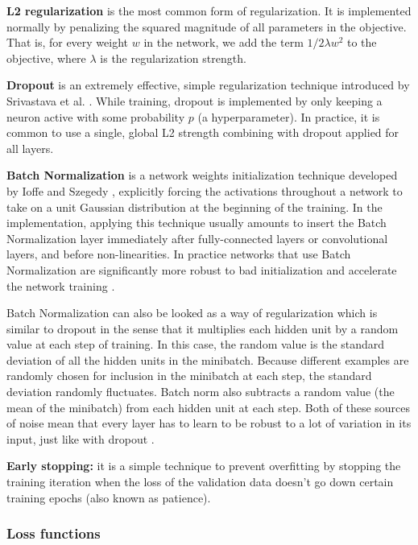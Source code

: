 \noindent\textbf{L2 regularization} is the most common form of regularization. It is implemented normally by penalizing the squared magnitude of all parameters in the objective. That is, for every weight $w$ in the network, we add the term $1/2 \lambda w^2$ to the objective, where $\lambda$ is the regularization strength.

\noindent\textbf{Dropout} is an extremely effective, simple regularization technique introduced by Srivastava et al. \cite{Srivastava2014}. While training, dropout is implemented by only keeping a neuron active with some probability $p$ (a hyperparameter). In practice, it is common to use a single, global L2 strength combining with dropout applied for all layers.

\noindent\textbf{Batch Normalization} is a network weights initialization technique developed by Ioffe and Szegedy \cite{Ioffe2015}, explicitly forcing the activations throughout a network to take on a unit Gaussian distribution at the beginning of the training. In the implementation, applying this technique usually amounts to insert the Batch Normalization layer immediately after fully-connected layers or convolutional layers, and before non-linearities. In practice networks that use Batch Normalization are significantly more robust to bad initialization and accelerate the network training \cite{Stanforduniversity}. 

Batch Normalization can also be looked as a way of regularization which is similar to dropout in the sense that it multiplies each hidden unit by a random value at each step of training. In this case, the random value is the standard deviation of all the hidden units in the minibatch. Because different examples are randomly chosen for inclusion in the minibatch at each step, the standard deviation randomly fluctuates. Batch norm also subtracts a random value (the mean of the minibatch) from each hidden unit at each step. Both of these sources of noise mean that every layer has to learn to be robust to a lot of variation in its input, just like with dropout \cite{Goodfellow2016}.

\noindent\textbf{Early stopping:} it is a simple technique to prevent overfitting by stopping the training iteration when the loss of the validation data doesn't go down certain training epochs (also known as patience). 

\subsubsection{Loss functions}

